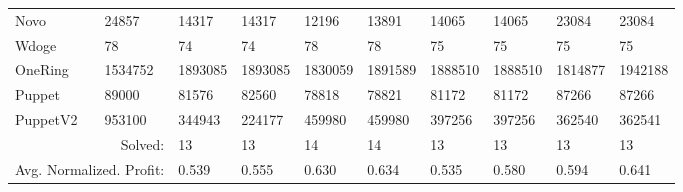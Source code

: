 \begin{table}[thbp]
\begin{tabular}{|l|l|llllllll|}
Novo                  & 24857                    & 14317   & 14317   & 12196   & 13891   & 14065   & 14065   & 23084   & 23084   \\
Wdoge                 & 78                       & 74      & 74      & 78      & 78      & 75      & 75      & 75      & 75      \\
OneRing               & 1534752                  & 1893085 & 1893085 & 1830059 & 1891589 & 1888510 & 1888510 & 1814877 & 1942188 \\
Puppet                & 89000                    & 81576   & 82560   & 78818   & 78821   & 81172   & 81172   & 87266   & 87266   \\
PuppetV2              & 953100                   & 344943  & 224177  & 459980  & 459980  & 397256  & 397256  & 362540  & 362541  \\ \hline
\multicolumn{2}{|r|}{Solved:}                    & 13      & 13      & 14      & 14      & 13      & 13      & 13      & 13     \\ 
\multicolumn{2}{|r|}{Avg. Normalized. Profit:}   & 0.539   & 0.555   & 0.630   & 0.634   & 0.535   & 0.580   & 0.594   & 0.641   \\ \hline 
\end{tabular}







\label{tab:SupProfit}
\end{table}
